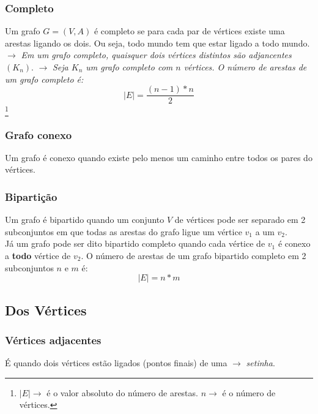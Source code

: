 \documentclass[12pt]{article}
\begin{document}
\subsubsection{Completo}
Um grafo $G = (V, A)$ é completo se para cada par de vértices existe uma arestas ligando os dois.
Ou seja, todo mundo tem que estar ligado a todo mundo.\\
$\longrightarrow$ \textit{Em um grafo completo, quaisquer dois vértices distintos são adjancentes $(K_n)$}.
$\longrightarrow$ \textit{Seja $K_n$ um grafo completo com $n$ vértices.
	O número de arestas de um grafo completo é:}\\

\begin{equation}
	|E| = \displaystyle\frac{(n - 1) * n}{2}
\end{equation}\footnote{
	$|E| \longrightarrow$ é o valor absoluto do número de arestas. $n \longrightarrow$ é o número de vértices.
}

\subsubsection{Grafo conexo}
Um grafo é conexo quando existe pelo menos um caminho entre todos os pares do vértices.

\subsubsection{Bipartição}
Um grafo é bipartido quando um conjunto $V$ de vértices pode ser separado em 2 subconjuntos em que todas as arestas do grafo ligue um vértice $v_1$ a um $v_2$.\\
Já um grafo pode ser dito bipartido completo quando cada vértice de $v_1$ é conexo a \textbf{todo} vértice de $v_2$.
O número de arestas de um grafo bipartido completo em 2 subconjuntos $n$ e $m$ é:
\begin{equation}
	|E| = n * m
\end{equation}

\subsection{Dos Vértices}

\subsubsection{Vértices adjacentes}
É quando dois vértices estão ligados (pontos finais) de uma $\longrightarrow$ \textit{setinha}.
\end{document}
